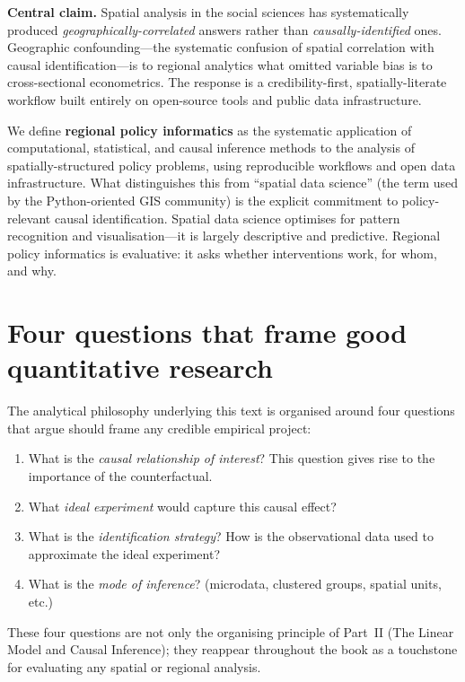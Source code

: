 \noindent\textbf{Central claim.} Spatial analysis in the social sciences has
systematically produced \emph{geographically-correlated} answers rather than
\emph{causally-identified} ones. Geographic confounding---the systematic
confusion of spatial correlation with causal identification---is to regional
analytics what omitted variable bias is to cross-sectional econometrics. The
response is a credibility-first, spatially-literate workflow built entirely on
open-source tools and public data infrastructure.

We define \textbf{regional policy informatics} as the systematic application
of computational, statistical, and causal inference methods to the analysis of
spatially-structured policy problems, using reproducible workflows and open
data infrastructure. What distinguishes this from ``spatial data science''
(the term used by the Python-oriented GIS community) is the explicit
commitment to policy-relevant causal identification. Spatial data science
optimises for pattern recognition and visualisation---it is largely descriptive
and predictive. Regional policy informatics is evaluative: it asks whether
interventions work, for whom, and why.

\section*{Four questions that frame good quantitative research}

The analytical philosophy underlying this text is organised around four
questions that \citet{Angrist2009a} argue should frame any credible empirical
project:

\begin{enumerate}
  \item What is the \emph{causal relationship of interest}? This question
    gives rise to the importance of the counterfactual.
  \item What \emph{ideal experiment} would capture this causal effect?
  \item What is the \emph{identification strategy}? How is the observational
    data used to approximate the ideal experiment?
  \item What is the \emph{mode of inference}? (microdata, clustered groups,
    spatial units, etc.)
\end{enumerate}

These four questions are not only the organising principle of Part~II
(The Linear Model and Causal Inference); they reappear throughout the book
as a touchstone for evaluating any spatial or regional analysis.

